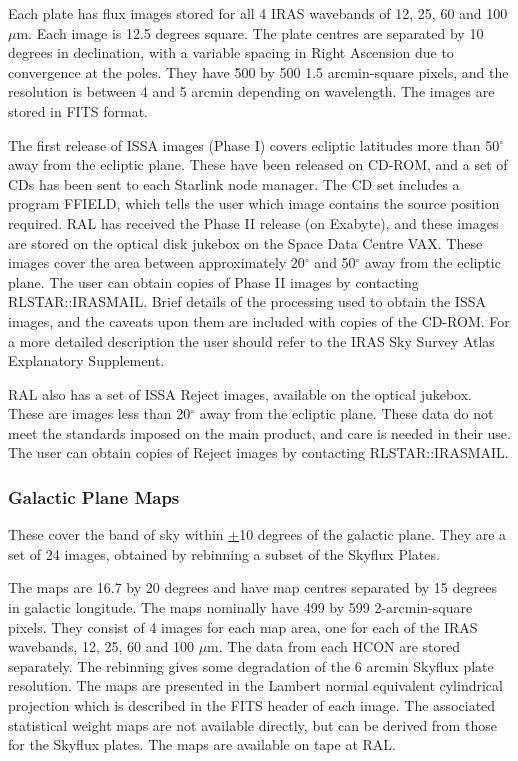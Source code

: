 \documentclass[11pt,nolof,noabs]{starlink}
\begin{document}
Each plate has flux images stored for all 4 IRAS wavebands of 12, 25, 60 and
100 $\mu$m.
Each image is 12.5 degrees square. The plate centres are separated by 10 degrees
in declination, with a variable spacing in Right Ascension due to convergence at
the poles. They have 500 by 500 1.5 arcmin-square pixels, and the resolution is
between 4 and 5 arcmin depending on wavelength.
The images are stored in FITS format.

The first release of ISSA images (Phase I) covers ecliptic latitudes more than
50$^{\circ}$ away from the ecliptic plane. These have been released on CD-ROM,
and a set of CDs has been sent to each Starlink node manager.
The CD set includes a program FFIELD, which tells the user which image
contains the source position required.
RAL has received the Phase II release (on Exabyte), and these images are stored
on the optical disk jukebox on the Space Data Centre VAX. These images cover
the area between approximately 20$^{\circ}$ and 50$^{\circ}$ away from the
ecliptic plane.
The user can obtain copies of Phase II images by contacting RLSTAR::IRASMAIL.
Brief details of
the processing used to obtain the ISSA images, and the caveats upon them are
included with copies of the CD-ROM. For a more detailed description the user
should refer to the IRAS Sky Survey Atlas Explanatory Supplement.

RAL also has a set of ISSA Reject images, available on the optical jukebox.
These are images less than 20$^{\circ}$ away from the ecliptic plane. These
data do not meet the standards imposed on the main product, and care is needed
in their use.
The user can obtain copies of Reject images by contacting RLSTAR::IRASMAIL.

\subsubsection{Galactic Plane Maps}
These cover the band of sky within \underline{+}10 degrees of the galactic
plane.
They are a set of 24 images, obtained by rebinning a subset of the Skyflux
Plates.

The maps are 16.7 by 20 degrees and have map centres separated by 15 degrees in
galactic longitude.
The maps nominally have 499 by 599 2-arcmin-square pixels.
They consist of 4 images for each map area, one for each of the IRAS
wavebands, 12, 25, 60 and 100 $\mu$m.
The data from each HCON are stored separately.
The rebinning gives some degradation of the 6 arcmin Skyflux plate resolution.
The maps are presented in the Lambert normal equivalent cylindrical projection
which is described in the FITS header of each image.
The associated statistical weight maps are not available directly, but can be
derived from those for the Skyflux plates.
The maps are available on tape at RAL.
\end{document}
